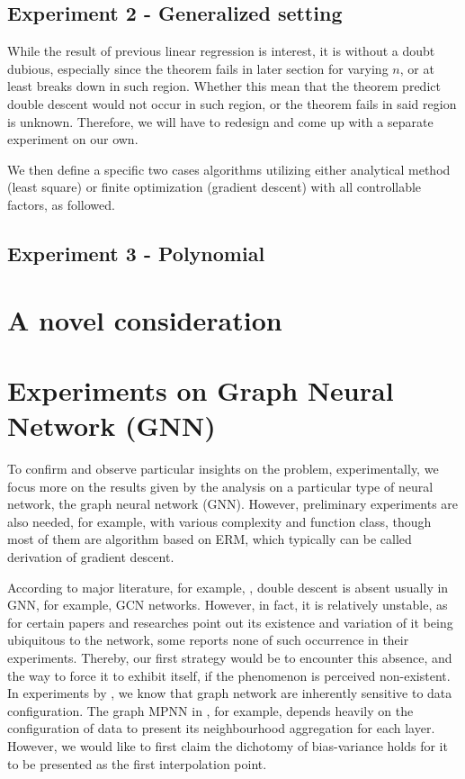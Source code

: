 \documentclass[10pt,oneside,oldfontcommands,dvipsnames,article]{memoir}
\begin{document}
\subsection{Experiment 2 - Generalized setting}
While the result of previous linear regression is interest, it is without a doubt dubious, especially since the theorem fails in later section for varying $n$, or at least breaks down in such region. Whether this mean that the theorem predict double descent would not occur in such region, or the theorem fails in said region is unknown. Therefore, we will have to redesign and come up with a separate experiment on our own. 

We then define a specific two cases algorithms utilizing either analytical method (least square) or finite optimization (gradient descent) with all controllable factors, as followed. 




\subsection{Experiment 3 - Polynomial}


\clearpage

\section{A novel consideration}


\clearpage 
\section{Experiments on Graph Neural Network (GNN)}
To confirm and observe particular insights on the problem, experimentally, we focus more on the results given by the analysis on a particular type of neural network, the graph neural network (GNN). However, preliminary experiments are also needed, for example, with various complexity and function class, though most of them are algorithm based on ERM, which typically can be called derivation of gradient descent. 

According to major literature, for example, \cite{shi2024homophilymodulatesdoubledescent}, double descent is absent usually in GNN, for example, GCN networks. However, in fact, it is relatively unstable, as for certain papers and researches point out its existence and variation of it being ubiquitous to the network, some reports none of such occurrence in their experiments. Thereby, our first strategy would be to encounter this absence, and the way to force it to exhibit itself, if the phenomenon is perceived non-existent. In experiments by \cite{shi2024homophilymodulatesdoubledescent,buschjager_generalized_2020}, we know that graph network are inherently sensitive to data configuration. The graph MPNN in \cite{GRP_Hamilton}, for example, depends heavily on the configuration of data to present its neighbourhood aggregation for each layer. However, we would like to first claim the dichotomy of bias-variance holds for it to be presented as the first interpolation point.
\end{document}
